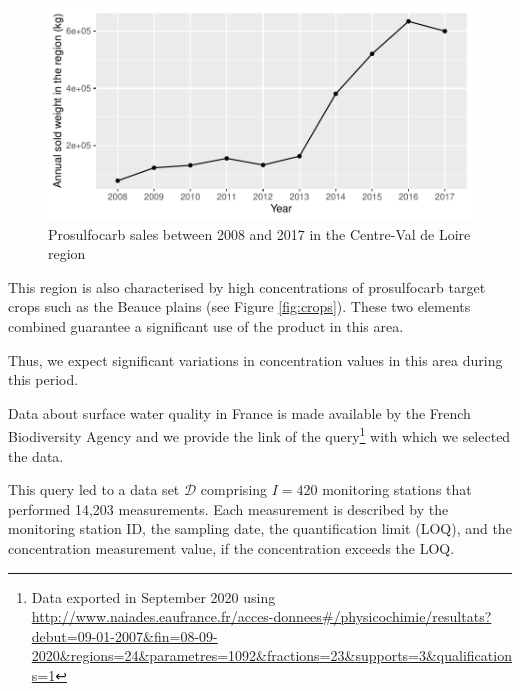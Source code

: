 \begin{figure}[htbp]
  \centering
  \includegraphics[]{figs/App/Sales_pro.pdf}
  \caption{Prosulfocarb sales between 2008 and 2017 in the Centre-Val de Loire region}
  \label{fig:sale}
\end{figure}


This region is also characterised by high concentrations of prosulfocarb target crops such as the Beauce plains (see Figure \ref{fig:crops}). These two elements combined guarantee a significant use of the product in this area.  

Thus, we expect significant variations in concentration values in this area during this period. 

Data about surface water quality in France is made available by the French Biodiversity Agency \cite{Naiade} and we provide the link of the query\footnote{Data exported in September 2020 using \\ \url{http://www.naiades.eaufrance.fr/acces-donnees\#/physicochimie/resultats?debut=09-01-2007&fin=08-09-2020&regions=24&parametres=1092&fractions=23&supports=3&qualifications=1}} with which we selected the data.

This query led to a data set $\mathcal D$ comprising $I = 420$ monitoring stations that performed 14,203 measurements. Each measurement is described by the monitoring station ID, the sampling date, the quantification limit (LOQ), and the concentration measurement value, if the concentration exceeds the LOQ. 


